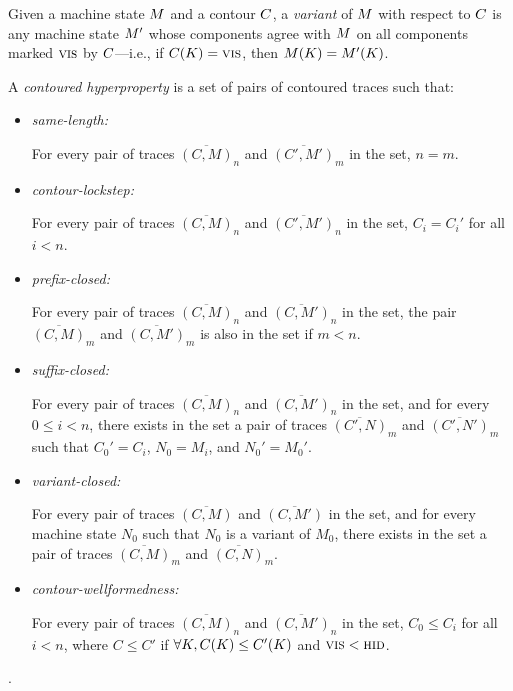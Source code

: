 \documentclass[conference]{IEEEtran}
\begin{document}

Given a machine state $M$ and a contour $C$, a {\em
  variant} of $M$ with respect to $C$ is any machine state
$M'$ whose components agree with $M$ on all components marked
$\textsc{vis}$ by $C$---i.e., if $C(K) = \textsc{vis}$, then
$M(K) = M'(K)$.

A {\em contoured hyperproperty} is a set of pairs of contoured
traces such that:
\begin{itemize}
\item {\em same-length:}

  For every pair of traces $\overline{(C, M)}_n$ and $\overline{(C',
    M')}_m$ in the set, $n = m$.
  
\item {\em contour-lockstep:}

  For every pair of traces $\overline{(C, M)}_n$ and $\overline{(C',
    M')}_n$ in the set, $C_i = C_i'$ for all $i<n$.

\item {\em prefix-closed:}

  For every pair of traces $\overline{(C, M)}_n$ and $\overline{(C,
    M')}_n$ in the set, the pair $\overline{(C, M)}_m$ and
  $\overline{(C, M')}_m$ is also in the set if $m < n$.

\item {\em suffix-closed:}

  For every pair of traces $\overline{(C, M)}_n$ and $\overline{(C,
    M')}_n$ in the set, and for every $0 \leq i < n$, there exists in
  the set a pair of traces $\overline{(C', N)}_m$ and $\overline{(C',
    N')}_m$ such that $C_0' = C_i$, $N_0 = M_i$, and $N_0' = M_0'$.
  
\item {\em variant-closed:}

  For every pair of traces $\overline{(C, M)}$ and $\overline{(C,
    M')}$ in the set, and for every machine state $N_0$ such that
  $N_0$ is a variant of $M_0$, there exists in the set a pair of
  traces $\overline{(C, M)}_m$ and $\overline{(C, N)}_m$.

\item {\em contour-wellformedness:}  

  For every pair of traces $\overline{(C, M)}_n$ and $\overline{(C,
    M')}_n$ in the set, $C_0 \leq C_i$ for all $i<n$, where $C \leq
  C'$ if $\forall K, C(K) \leq C'(K)$ and
  $\textsc{vis} < \textsc{hid}$.


\end{itemize}
\iftext{} \fi.
\end{document}

